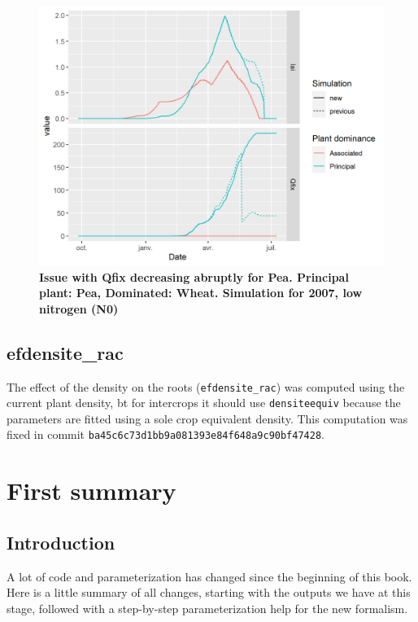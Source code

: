 \documentclass[
]{book}
\begin{document}
\begin{figure}
\centering
\includegraphics{img/Qfix_issue.png}
\caption{\label{fig:Qfix}\textbf{Issue with Qfix decreasing abruptly for Pea. Principal plant: Pea, Dominated: Wheat. Simulation for 2007, low nitrogen (N0)}}
\end{figure}

\hypertarget{efdensite_rac}{%
\section{efdensite\_rac}\label{efdensite_rac}}

The effect of the density on the roots (\texttt{efdensite\_rac}) was computed using the current plant density, bt for intercrops it should use \texttt{densiteequiv} because the parameters are fitted using a sole crop equivalent density. This computation was fixed in commit \texttt{ba45c6c73d1bb9a081393e84f648a9c90bf47428}.

\hypertarget{summary1}{%
\chapter{First summary}\label{summary1}}

\hypertarget{introduction-11}{%
\section{Introduction}\label{introduction-11}}

A lot of code and parameterization has changed since the beginning of this book. Here is a little summary of all changes, starting with the outputs we have at this stage, followed with a step-by-step parameterization help for the new formalism.
\end{document}

